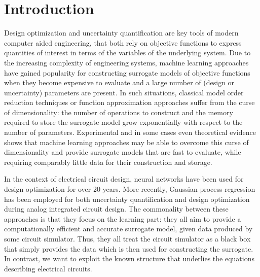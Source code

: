 \documentclass[AMA,STIX1COL]{WileyNJD-v2}
\begin{document}
\section{Introduction}
\label{sec:int}
Design optimization and uncertainty quantification are key tools of modern computer aided engineering, that both rely on objective functions to express quantities of interest in terms of the variables of the underlying system. Due to the increasing complexity of engineering systems, machine learning approaches have gained popularity for constructing surrogate models of objective functions when they become expensive to evaluate and a large number of (design or uncertainty) parameters are present. In such situations, classical model order reduction techniques\cite{schilders2008} or function approximation approaches\cite{xiu2010} suffer from the curse of dimensionality: the number of operations to construct and the memory required to store the surrogate model grow exponentially with respect to the number of parameters. Experimental and in some cases even theoretical evidence\cite{beneventano2020} shows that machine learning approaches may be able to overcome this curse of dimensionality and provide surrogate models that are fast to evaluate, while requiring comparably little data for their construction and storage.

In the context of electrical circuit design, neural networks have been used for design optimization for over 20 years\cite{zaabab1995,fang2000}. More recently, Gaussian process regression has been employed for both uncertainty quantification and design optimization during analog integrated circuit design\cite{wang2018,sanabria2020}. The commonality between these approaches is that they focus on the learning part: they all aim to provide a computationally efficient and accurate surrogate model, given data produced by some circuit simulator. Thus, they all treat the circuit simulator as a black box that simply provides the data which is then used for constructing the surrogate. In contrast, we want to exploit the known structure that underlies the equations describing electrical circuits.
\end{document}
